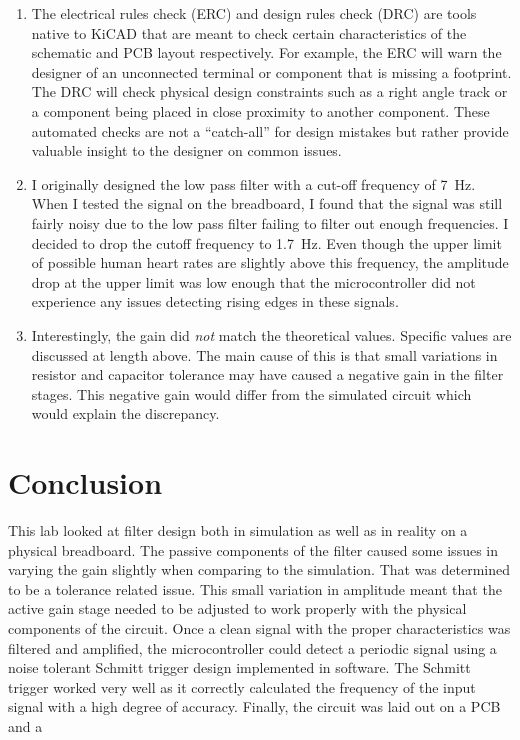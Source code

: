 \documentclass[CMPE]{../KGCOEReport}
\begin{document}
	\begin{enumerate}
	\item
	The electrical rules check (ERC) and design rules check (DRC) are tools native
	to KiCAD that are meant to check certain characteristics of the schematic and
	PCB layout respectively. For example, the ERC will warn the designer of an
	unconnected terminal or component that is missing a footprint. The DRC will check
	physical design constraints such as a right angle track or a component being
	placed in close proximity to another component. These automated checks are not
	a ``catch-all'' for design mistakes but rather provide valuable insight to the
	designer on common issues.
	\item
	I originally designed the low pass filter with a cut-off frequency of \SI{7}{\hertz}.
	When I tested the signal on the breadboard, I found that the signal was still fairly
	noisy due to the low pass filter failing to filter out enough frequencies. I decided to
	drop the cutoff frequency to \SI{1.7}{\hertz}. Even though the upper limit of possible
	human heart rates are slightly above this frequency, the amplitude drop at the upper
	limit was low enough that the microcontroller did not experience any issues detecting
	rising edges in these signals.
	\item
	Interestingly, the gain did \emph{not} match the theoretical values. Specific values
	are discussed at length above. The main cause of this is that small variations in
	resistor and capacitor tolerance may have caused a negative gain in the filter stages.
	This negative gain would differ from the simulated circuit which would explain the
	discrepancy.
	\end{enumerate}

    \section*{Conclusion}

	This lab looked at filter design both in simulation as well as in reality on
	a physical breadboard. The passive components of the filter caused some issues in
	varying the gain slightly when comparing to the simulation. That was determined to
	be a tolerance related issue. This small variation in amplitude meant that the
	active gain stage needed to be adjusted to work properly with the physical
	components of the circuit. Once a clean signal with the proper characteristics
	was filtered and amplified, the microcontroller could detect a periodic signal
	using a noise tolerant Schmitt trigger design implemented in software. The Schmitt
	trigger worked very well as it correctly calculated the frequency of the input
	signal with a high degree of accuracy. Finally, the circuit was laid out on a PCB
	and a 
\end{document}
